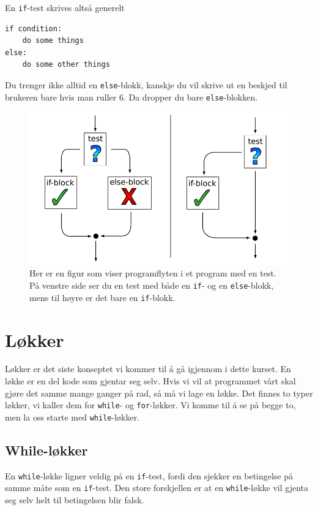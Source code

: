 \documentclass[a4paper, 11pt, notitlepage]{article}
\begin{document}
En \verb+if+-test skrives altså generelt
\begin{lstlisting}
if condition:
	do some things
else:
	do some other things
\end{lstlisting}
Du trenger ikke alltid en \verb+else+-blokk, kanskje du vil skrive ut en beskjed til brukeren bare hvis man ruller 6. Da dropper du bare \verb+else+-blokken. 

\begin{figure}[tpb]
	\centering
	\includegraphics[width=\textwidth]{if_else}
	\caption{Her er en figur som viser programflyten i et program med en test. På venstre side ser du en test med både en \texttt{if}- og en \texttt{else}-blokk, mens til høyre er det bare en \texttt{if}-blokk.}
\end{figure}

\clearpage
\section*{Løkker}

Løkker er det siste konseptet vi kommer til å gå igjennom i dette kurset. En løkke er en del kode som gjentar seg selv. Hvis vi vil at programmet vårt skal gjøre det samme mange ganger på rad, så må vi lage en løkke. Det finnes to typer løkker, vi kaller dem for \verb+while+- og \verb+for+-løkker. Vi komme til å se på begge to, men la oss starte med \verb+while+-løkker.

\subsection*{While-løkker}

En \verb+while+-løkke ligner veldig på en \verb+if+-test, fordi den sjekker en betingelse på samme måte som en \verb+if+-test. Den store forskjellen er at en \verb+while+-løkke vil gjenta seg selv helt til betingelsen blir falsk.
\end{document}
